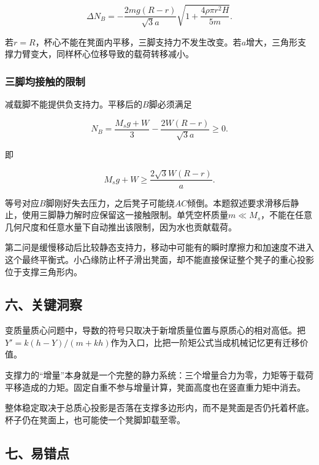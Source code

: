 \documentclass[12pt,a4paper,fontset=fandol]{ctexart}
\begin{document}
\[
\boxed{\Delta N_B=
-\frac{2mg(R-r)}{\sqrt3a}
\sqrt{1+\frac{4\rho\pi r^2H}{5m}}}.
\]

若\(r=R\)，杯心不能在凳面内平移，三脚支持力不发生改变。若\(a\)增大，三角形支撑力臂变大，同样杯心位移导致的载荷转移减小。

\par\noindent\begin{minipage}{\linewidth}
\subsubsection{三脚均接触的限制}\label{ux4e09ux811aux5747ux63a5ux89e6ux7684ux9650ux5236}

减载脚不能提供负支持力。平移后的\(B\)脚必须满足

\[
N_B=\frac{M_sg+W}{3}
-\frac{2W(R-r)}{\sqrt3a}\ge0.
\]

即

\[
\boxed{
M_sg+W\ge \frac{2\sqrt3W(R-r)}a}.
\]

等号对应\(B\)脚刚好失去压力，之后凳子可能绕\(AC\)倾倒。本题叙述要求滑移后静止，使用三脚静力解时应保留这一接触限制。单凭空杯质量\(m\ll M_s\)，不能在任意几何尺度和任意水量下自动推出该限制，因为水也贡献载荷。

第二问是缓慢移动后比较静态支持力，移动中可能有的瞬时摩擦力和加速度不进入这个最终平衡式。小凸缘防止杯子滑出凳面，却不能直接保证整个凳子的重心投影位于支撑三角形内。

\end{minipage}\par
\subsection{六、关键洞察}\label{ux516dux5173ux952eux6d1eux5bdf}

变质量质心问题中，导数的符号只取决于新增质量位置与原质心的相对高低。把\(Y'=k(h-Y)/(m+kh)\)作为入口，比把一阶矩公式当成机械记忆更有迁移价值。

支撑力的``增量''本身就是一个完整的静力系统：三个增量合力为零，力矩等于载荷平移造成的力矩。固定自重不参与增量计算，凳面高度也在竖直重力矩中消去。

整体稳定取决于总质心投影是否落在支撑多边形内，而不是凳面是否仍托着杯底。杯子仍在凳面上，也可能使一个凳脚卸载至零。

\subsection{七、易错点}\label{ux4e03ux6613ux9519ux70b9}
\end{document}

